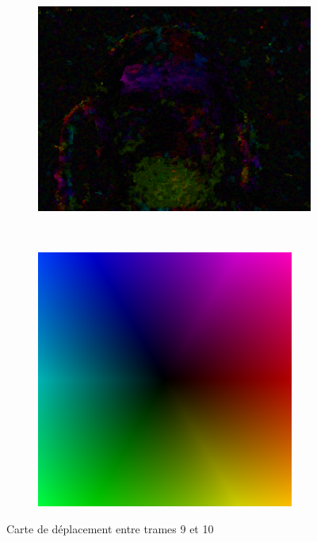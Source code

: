 \documentclass[compress,pdf,11pt,xcolor=dvipsnames]{beamer}
\begin{document}
\begin{frame}{}
\begin{figure}[ht!]
        \centering
        \begin{subfigure}[b]{0.6\textwidth}
                \centering
                \includegraphics[width=\textwidth]{img/f9disp}
        \end{subfigure}%
        ~ %
        \begin{subfigure}[b]{0.4\textwidth}
                \centering
                \includegraphics[scale=0.43]{img/ColorChart}
        \end{subfigure}
        \caption{Carte de déplacement entre trames 9 et 10}

\end{figure}
\end{frame}{}
\end{document}
